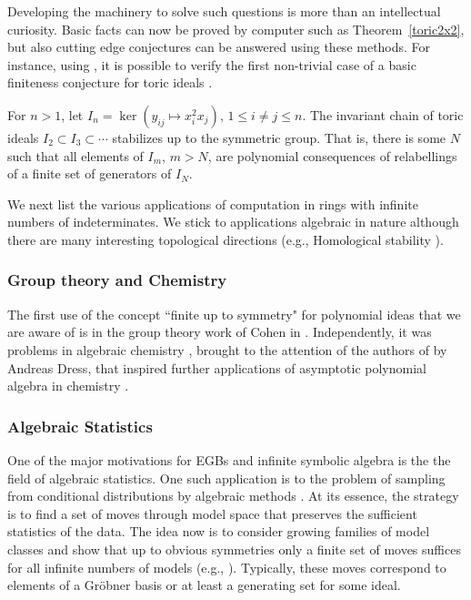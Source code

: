 Developing the machinery to solve such questions is more than an intellectual curiosity.  Basic facts can now be proved by computer such as Theorem~\ref{toric2x2}, but also cutting edge conjectures can be answered using these methods.  For instance, using \cite{EquivariantGB}, it is possible to verify the first non-trivial case of a basic finiteness conjecture for toric ideals \cite{draisma2013noetherianity}.  

\begin{theorem}\label{monomthm}
For $n > 1$, let $I_n = \ker (y_{ij} \mapsto x_i^2 x_j)$, $1 \leq i \neq j \leq n$.  The invariant chain of toric ideals $I_2 \subset I_3 \subset \cdots$ stabilizes up to the symmetric group.  That is, there is some $N$ such that all elements of $I_m$, $m > N$, are polynomial consequences of relabellings of a finite set of generators of $I_N$.
\end{theorem}


We next list the various applications of computation in rings with infinite numbers of indeterminates.  
We stick to applications algebraic in nature although there are many interesting topological directions (e.g., Homological stability \cite{randal2013homological, church2012homological}).

\subsubsection{Group theory and Chemistry}

The first use of the concept ``finite up to symmetry" for polynomial ideas that we are aware of is in the group theory work of Cohen in \cite{cohen1967laws}.  
Independently, it was problems in algebraic chemistry \cite{ruch1967vandermondesche}, brought to the attention of the authors of \cite{aschenbrenner2007finite} by Andreas Dress, that inspired further applications of asymptotic polynomial algebra in chemistry \cite{Draisma08b}.

\subsubsection{Algebraic Statistics}

One of the major motivations for EGBs and infinite symbolic algebra is the the field of algebraic statistics.  One such application is to the problem of sampling from conditional distributions by algebraic methods \cite{diaconis1998algebraic}.  At its essence, the strategy is to find a set of moves through model space that preserves the sufficient statistics of the data.   The idea now is to consider growing families of model classes and show that up to obvious symmetries only a finite set of moves suffices for all infinite numbers of models (e.g., \cite{aoki2003minimal, santos2003higher, hocsten2007finiteness, drton2007algebraic, Draisma08b, Brouwer09e, draisma2009ideals, hillar2012finite, draisma2015finiteness}).  Typically, these moves correspond to elements of a Gr\"obner basis or at least a generating set for some ideal.

